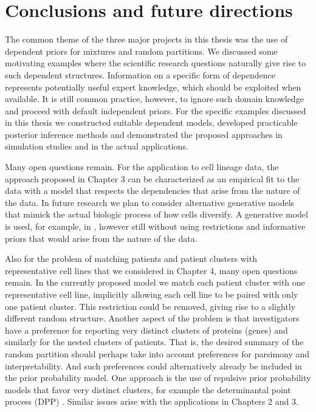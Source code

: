 \chapter{Conclusions and future directions}
\label{ch:conclusions}

The common theme of the three major projects in this thesis was the
use of dependent priors for mixtures and random partitions. 
We discussed some motivating examples where the scientific research
questions naturally give rise to such dependent structures. 
Information on a specific form of dependence represents potentially
useful expert knowledge, which should be exploited when
available. It is still common practice, however, to ignore such domain
knowledge and proceed with default independent priors.
For the specific examples discussed in this thesis we constructed
suitable dependent models, developed practicable posterior inference
methods and demonstrated the proposed approaches in simulation studies
and in the actual applications.

Many open questions remain. For the application to cell lineage data,
the approach proposed in Chapter 3 can be characterized as an
empirical fit to the data with a model that respects the dependencies
that arise from the nature of the data. In future research we plan to
consider alternative generative models that mimick the actual biologic
process of how cells diversify. A generative model is used, for
example, in \cite{Shiffman18}, however still without using
restrictions and informative priors that would arise from the nature
of the data.

Also for the problem of matching patients and patient clusters with
representative cell lines that we considered in Chapter 4, many open
questions remain.
In the currently proposed model we match each patient cluster with one
representative cell line, implicitly allowing each cell line to be
paired with only one patient cluster. This restriction could be
removed, giving rise to a slightly different random structure.
Another aspect of the problem is that investigators have a preference
for reporting very distinct clusters of proteins (genes) and similarly
for the nested clusters of patients. That is, the desired summary of
the random partition should perhaps take into account preferences for
parsimony and interpretability. And such preferences could
alternatively already be included in the prior probability model.
One approach is the use of repulsive prior probability models that
favor very distinct clusters, for example the determinantal point
process (DPP) \citep{xu2016bayesian}. Similar issues arise with the applications in Chapters 2 and 3.





